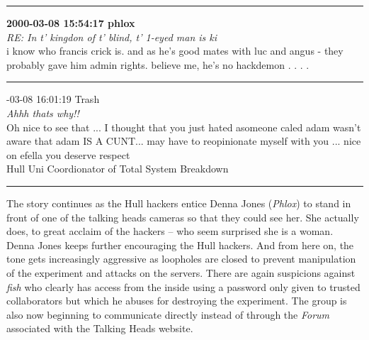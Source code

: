 \begin{mail}
\rule{0.8\textwidth}{.4pt}

{\bf2000-03-08 15:54:17	phlox}\\
{\itshape RE: In t' kingdon of t' blind, t' 1-eyed man is ki}\\
i know who francis crick is. and as he's good mates with luc and angus - they probably gave him admin rights. believe me, he's no hackdemon . . . .	\\

\rule{0.8\textwidth}{.4pt}

{-03-08 16:01:19 Trash}\\
{\itshape Ahhh thats why!!}\\
Oh nice to see that ...  I thought that you just hated asomeone caled adam wasn't aware that adam IS A CUNT... 
may have to reopinionate myself with you ...  nice on efella you deserve respect \\
Hull Uni Coordionator of Total System Breakdown

\rule{0.8\textwidth}{.4pt}
\end{mail}

 
The story continues as the Hull hackers entice Denna Jones ({\it Phlox}) to stand in front of one of 
the talking heads cameras so that they could see her. She actually does, to great acclaim of the hackers -- who 
seem surprised she is a woman. Denna Jones keeps further encouraging the Hull hackers. 
And from here on, the tone gets increasingly aggressive as loopholes are closed to prevent manipulation of the experiment
and attacks on the servers. There are again suspicions against {\it fish} who clearly has access from the inside using 
a password only given to trusted collaborators but which he abuses for destroying the experiment. The group is also now
beginning to communicate directly instead of through the {\it Forum} associated with the Talking Heads website.

